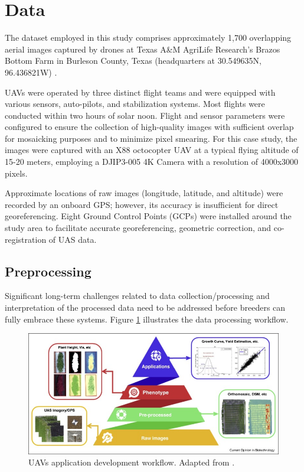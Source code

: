 \section{Data}
\label{sec:data}

The dataset employed in this study comprises approximately 1,700 overlapping aerial images captured by drones at Texas A\&M AgriLife Research's Brazos Bottom Farm in Burleson County, Texas (headquarters at 30.549635N, 96.436821W) \cite{shi_2021_5089956}.

UAVs were operated by three distinct flight teams and were equipped with various sensors, auto-pilots, and stabilization systems. Most flights were conducted within two hours of solar noon. Flight and sensor parameters were configured to ensure the collection of high-quality images with sufficient overlap for mosaicking purposes and to minimize pixel smearing. For this case study, the images were captured with an X88 octocopter UAV at a typical flying altitude of 15-20 meters, employing a DJIP3-005 4K Camera with a resolution of 4000x3000 pixels.

Approximate locations of raw images (longitude, latitude, and altitude) were recorded by an onboard GPS; however, its accuracy is insufficient for direct georeferencing. Eight Ground Control Points (GCPs) were installed around the study area to facilitate accurate georeferencing, geometric correction, and co-registration of UAS data.

\subsection{Preprocessing}
\label{sec:preprocessing}

Significant long-term challenges related to data collection/processing and interpretation of the processed data need to be addressed before breeders can fully embrace these systems. Figure \ref{fig:dev_pipeline} illustrates the data processing workflow.

\begin{figure}[t!]
\includegraphics[width=\linewidth]{../images/dev_pipeline}
\caption{UAVs application development workflow. Adapted from \cite{jung2021potential}.}
\label{fig:dev_pipeline}
\end{figure}

